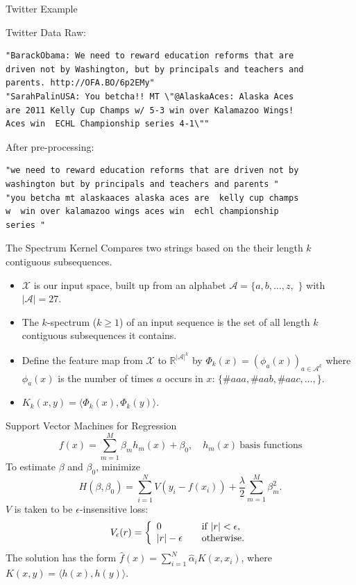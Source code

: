 \documentclass{beamer}
\begin{document}
\begin{frame}{Twitter Example}
\begin{figure}[!ht]
 \end{figure}
\end{frame}

\begin{frame}[fragile]{Twitter Data}
  Raw:
\begin{verbatim}
"BarackObama: We need to reward education reforms that are
driven not by Washington, but by principals and teachers and
parents. http://OFA.BO/6p2EMy"
"SarahPalinUSA: You betcha!! MT \"@AlaskaAces: Alaska Aces
are 2011 Kelly Cup Champs w/ 5-3 win over Kalamazoo Wings!
Aces win  ECHL Championship series 4-1\""
\end{verbatim}
  After pre-processing:
\begin{verbatim}
"we need to reward education reforms that are driven not by
washington but by principals and teachers and parents "
"you betcha mt alaskaaces alaska aces are  kelly cup champs
w  win over kalamazoo wings aces win  echl championship
series "
\end{verbatim}
\end{frame}

\begin{frame}{The Spectrum Kernel}
  Compares two strings based on the their length $k$ contiguous
  subsequences. \pause
  \begin{itemize}
  \item $\mathcal{X}$ is our input space, built up from an alphabet
    $\mathcal{A} = \{a,b,\ldots,z,$ $\}$ with $|\mathcal{A}|=27$. \pause
  \item The $k$-spectrum ($k \geq 1$) of an input sequence is the set
    of all length $k$ contiguous subsequences it contains. \pause
  \item Define the feature map from $\mathcal{X}$ to
    $\mathbb{R}^{|\mathcal{A}|^k}$ by $\Phi_k(x) = (\phi_a(x))_{a \in
      \mathcal{A}^k}$ where $\phi_a(x)$ is the number of times $a$
    occurs in $x$: $\{\#aaa,\#aab,\#aac,\ldots,\}$. \pause
  \item $K_k(x,y) = \langle \Phi_k(x),\Phi_k(y) \rangle$.
  \end{itemize}
\end{frame}

\begin{frame}{Support Vector Machines for Regression}
  $$
  f(x) = \sum_{m=1}^M \beta_m h_m(x) + \beta_0, \quad {h_m(x)} \:
\text{basis functions}
  $$
  \pause
  To estimate $\beta$ and $\beta_0$, minimize
  $$
  H(\beta,\beta_0) = \sum_{i=1}^N V(y_i-f(x_i)) +
  \frac{\lambda}{2}\sum_{m=1}^M \beta_m^2.
  $$
  \pause
  $V$ is taken to be $\epsilon$-insensitive loss:
  \[
  V_\epsilon(r) = \left\{
    \begin{array}{l l}
      0 & \quad \text{if } |r| < \epsilon,\\
      |r|-\epsilon & \quad \text{otherwise.}\\
    \end{array} \right.
  \]
  \pause
  The solution has the form $\hat{f}(x)=\sum_{i=1}^N \hat\alpha_i
  K(x,x_i)$, where $K(x,y)=\langle h(x),h(y) \rangle$.
\end{frame}
\end{document}
